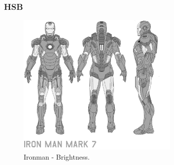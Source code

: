 \documentclass{beamer}
\begin{document}
\begin{frame}
\frametitle{HSB}
		
		\begin{figure}[!h]
			\begin{center}
				\includegraphics[width=0.7\textwidth]{Figures/Brightness}
				\caption{Ironman - Brightness.}
			\end{center}
		\end{figure}
\end{frame}

\end{document}

